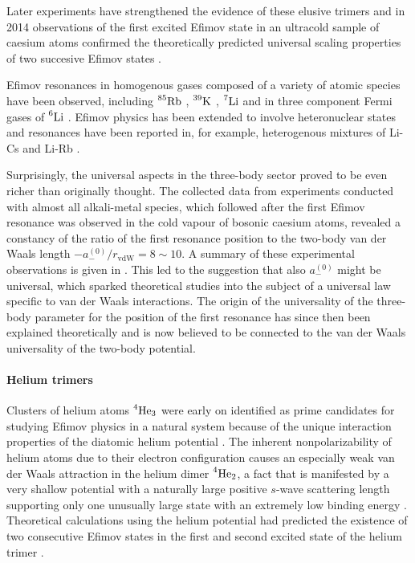 Later experiments have strengthened the evidence of these elusive trimers and in 2014 observations of the first excited Efimov state in an ultracold sample of caesium atoms confirmed the theoretically predicted universal scaling properties of two succesive Efimov states \cite{Huang2014}.

Efimov resonances in homogenous gases composed of a variety of atomic species have been observed, including $\prescript{85}{}{\mathrm{Rb}}$ \cite{Klauss2017}, $\prescript{39}{}{\mathrm{K}}$ \cite{Potassium}, $\prescript{7}{}{\mathrm{Li}}$ \cite{Lithium7} and in three component Fermi gases of $\prescript{6}{}{\mathrm{Li}}$ \cite{Williams2009}. Efimov physics has been extended to involve heteronuclear states and resonances have been reported in, for example, heterogenous mixtures of Li-Cs and Li-Rb \cite{LithiumRubidium,LithiumCeasium}.

Surprisingly, the universal aspects in the three-body sector proved to be even richer than originally thought. The collected data from experiments conducted with almost all alkali-metal species, which followed after the first Efimov resonance was observed in the cold vapour of bosonic caesium atoms, revealed a constancy of the ratio of the first resonance position to the two-body van der Waals length $-a_-^{(0)}/r_{\mathrm{vdW}} = 8 \sim 10$. A summary of these experimental observations is given in \cite{WANG20131}. This led to the suggestion that also $a_-^{(0)}$ might be universal, which sparked theoretical studies into the subject of a universal law specific to van der Waals interactions. The origin of the universality of the three-body parameter for the position of the first resonance has since then been explained theoretically \cite{3BP_origin} and is now believed to be connected to the van der Waals universality of the two-body potential.  

\paragraph{Helium trimers}
Clusters of helium atoms $\prescript{4}{}{\mathrm{He}}_3$ were early on identified as prime candidates for studying Efimov physics in a natural system because of the unique interaction properties of the diatomic helium potential \cite{Lim1977}. The inherent nonpolarizability of helium atoms due to their electron configuration causes an especially weak van der Waals attraction in the helium dimer $\prescript{4}{}{\mathrm{He}}_2$, a fact that is manifested by a very shallow potential with a naturally large positive $s$-wave scattering length supporting only one unusually large state with an extremely low binding energy \cite{Blume2019}. Theoretical calculations using the helium potential had predicted the existence of two consecutive Efimov states in the first and second excited state of the helium trimer \cite{Kamimura2012}.

